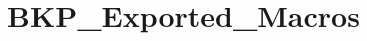 \hypertarget{group__BKP__Exported__Macros}{
\section{BKP\_\-Exported\_\-Macros}
\label{group__BKP__Exported__Macros}
}
